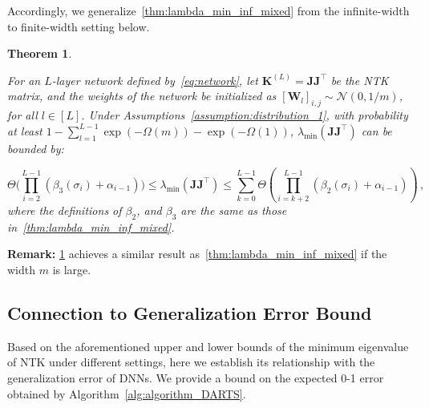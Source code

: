 \documentclass[nohyperref]{article}
\theoremstyle{plain}
\newtheorem{theorem}{Theorem}
\theoremstyle{definition}
\theoremstyle{remark}
\begin{document}
Accordingly, we generalize~\cref{thm:lambda_min_inf_mixed} from the infinite-width to finite-width setting below.
\begin{theorem}
\label{thm:lambda_min_finite}

For an $L$-layer network defined by~\cref{eq:network}, let $\bm{K}^{(L)} = \bm{JJ}^{\top}$ be the NTK matrix, and the weights of the network be initialized as $[\bm{W}_l]_{i,j}\sim \mathcal{N} (0,1/m)$, for all $l \in [L]$. Under Assumptions~\ref{assumption:distribution_1}, with probability at least $1-\sum_{l=1}^{L-1}\exp(-\Omega (m))-\exp(-\Omega (1))$, $\lambda_{\min}(\bm{JJ}^{\top})$ can be bounded by:

\begin{equation*}
    \Theta \bigg(\prod_{i=2}^{L-1}(\beta_3(\sigma_i)+\alpha_{i-1} ) \bigg) \leq \lambda_{\min}(\bm{JJ}^{\top})\leq \sum_{k=0}^{L-1}\Theta \left(\prod_{i=k+2}^{L-1}(\beta_2(\sigma_i)+\alpha_{i-1} ) \right)\,,
\end{equation*}
where the definitions of $\beta_2$, and $\beta_3$ are the same as those in~\cref{thm:lambda_min_inf_mixed}.


\end{theorem}
{\bf Remark:} 
\cref{thm:lambda_min_finite} achieves a similar result as~\cref{thm:lambda_min_inf_mixed} if the width $m$ is large.

\subsection{Connection to Generalization Error Bound}
\label{ssec:NTK_Connection_to_Generalization}

Based on the aforementioned upper and lower bounds of the minimum eigenvalue of NTK under different settings, here we establish its relationship with the generalization error of DNNs. We provide a bound on the expected 0-1 error obtained by Algorithm~\ref{alg:algorithm_DARTS}.
\end{document}
